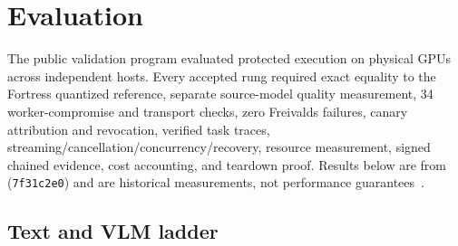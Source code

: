 \section{Evaluation}\label{sec:evaluation}

The public validation program evaluated protected execution on physical GPUs across independent hosts. Every accepted rung required exact equality to the Fortress quantized reference, separate source-model quality measurement, 34 worker-compromise and transport checks, zero Freivalds failures, canary attribution and revocation, verified task traces, streaming/cancellation/concurrency/recovery, resource measurement, signed chained evidence, cost accounting, and teardown proof. Results below are from \frozenbuild{} (\texttt{7f31c2e0}) and are historical measurements, not performance guarantees~\cite{xurcroh-validation}.

\subsection{Text and VLM ladder}

\begin{table}[htbp]
\centering\scriptsize
\caption{Physical text ladder. Quality is perplexity delta over 10,000 public prompts against the original model; L6 compares against the unpruned original. All rows have zero maximum absolute error against the Fortress quantized reference.}
\label{tab:text-ladder}
\end{table}

